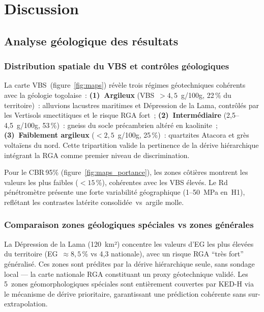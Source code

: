 \documentclass[10pt,a4paper,twocolumn]{article}
\begin{document}
	\section{Discussion}
	\label{sec:discussion}
	
	\subsection{Analyse géologique des résultats}
	\label{subsec:geologie}
	
	\subsubsection{Distribution spatiale du VBS et contrôles géologiques}
	
	La carte VBS~(figure~\ref{fig:maps}) révèle trois régimes géotechniques
	cohérents avec la géologie togolaise~:
	\textbf{(1)~Argileux} (VBS~$>4{,}5$~g/100g, 22\,\% du territoire)~:
	alluvions lacustres maritimes et Dépression de la Lama, contrôlés
	par les Vertisols smectitiques et le risque RGA fort~;
	\textbf{(2)~Intermédiaire} (2{,}5--4{,}5~g/100g, 53\,\%)~:
	gneiss du socle précambrien altéré en kaolinite~;
	\textbf{(3)~Faiblement argileux} ($<2{,}5$~g/100g, 25\,\%)~:
	quartzites Atacora et grès voltaïens du nord.
	Cette tripartition valide la pertinence de la dérive hiérarchique
	intégrant la RGA comme premier niveau de discrimination.
	
	Pour le CBR\,95\% (figure~\ref{fig:maps_portance}), les zones
	côtières montrent les valeurs les plus faibles ($<15$\,\%),
	cohérentes avec les VBS élevés. Le Rd pénétromètre présente une
	forte variabilité géographique (1--50~MPa en~H1), reflétant les
	contrastes latérite consolidée~vs~argile molle.
	
	\subsubsection{Comparaison zones géologiques spéciales vs zones générales}
	
	La Dépression de la Lama (120~km²) concentre les valeurs d'EG
	les plus élevées du territoire (EG~$\approx8{,}5$\,\% vs 4{,}3
	nationale), avec un risque RGA ``très fort'' généralisé.
	Ces zones sont prédites par la dérive hiérarchique seule, sans
	sondage local --- la carte nationale RGA constituant un proxy
	géotechnique validé. Les 5~zones géomorphologiques spéciales
	sont entièrement couvertes par KED-H via le mécanisme de dérive
	prioritaire, garantissant une prédiction cohérente sans sur-extrapolation.
	
\end{document}
